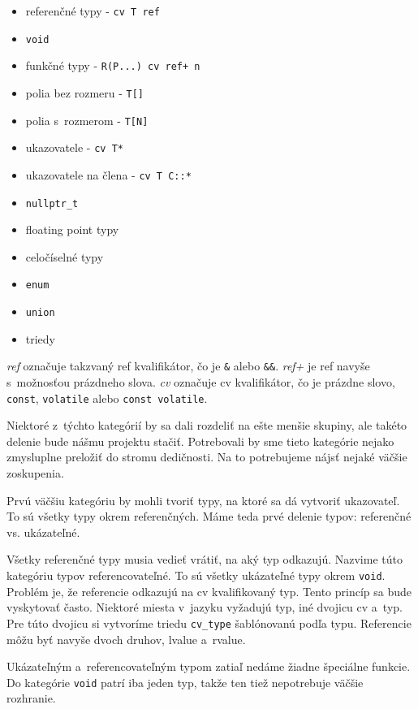 \begin{itemize}[itemsep=0pt]
    \item referenčné typy - \texttt{cv T ref}
    \item \texttt{void}
    \item funkčné typy - \texttt{R(P...) cv ref+ n}
    \item polia bez rozmeru - \texttt{T[]}
    \item polia s~rozmerom - \texttt{T[N]}
    \item ukazovatele - \texttt{cv T*}
    \item ukazovatele na člena - \texttt{cv T C::*}
    \item \texttt{nullptr\_t}
    \item floating point typy
    \item celočíselné typy
    \item \texttt{enum}
    \item \texttt{union}
    \item triedy
\end{itemize}
\emph{ref} označuje takzvaný ref kvalifikátor, čo je \texttt{\&} alebo \texttt{\&\&}. \emph{ref+} je ref navyše s~možnosťou prázdneho slova. \emph{cv} označuje cv kvalifikátor, čo je prázdne slovo, \texttt{const}, \texttt{volatile} alebo \texttt{const volatile}.

Niektoré z~týchto kategórií by sa dali rozdeliť na ešte menšie skupiny, ale takéto delenie bude nášmu projektu stačiť. Potrebovali by sme tieto kategórie nejako zmysluplne preložiť do stromu dedičnosti. Na to potrebujeme nájsť nejaké väčšie zoskupenia.

Prvú väčšiu kategóriu by mohli tvoriť typy, na ktoré sa dá vytvoriť ukazovateľ. To sú všetky typy okrem referenčných. Máme teda prvé delenie typov: referenčné vs. ukázateľné.

Všetky referenčné typy musia vedieť vrátiť, na aký typ odkazujú. Nazvime túto kategóriu typov referencovateľné. To sú všetky ukázateľné typy okrem \texttt{void}. Problém je, že referencie odkazujú na cv kvalifikovaný typ. Tento princíp sa bude vyskytovať často. Niektoré miesta v~jazyku vyžadujú typ, iné dvojicu cv a~typ. Pre túto dvojicu si vytvoríme triedu \texttt{cv\_type} šablónovanú podľa typu. Referencie môžu byť navyše dvoch druhov, lvalue a~rvalue.

Ukázateľným a~referencovateľným typom zatiaľ nedáme žiadne špeciálne funk\-cie. Do kategórie \texttt{void} patrí iba jeden typ, takže ten tiež nepotrebuje väčšie rozhranie.

